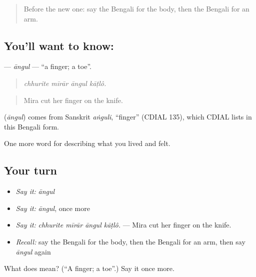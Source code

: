 \label{lesson:BN-C466-angul}



\begin{quote}
Before the new one: say the Bengali for the body, then the Bengali for an arm.
\end{quote}

\subsection*{You'll want to know: }
\textbf{} — \emph{āngul} — \textquotedblleft{}a finger; a toe\textquotedblright{}.

\begin{quote}
   
\end{quote}

\begin{quote}
\emph{chhurite mīrār āngul kāṭlô.}
\end{quote}

\begin{quote}
Mira cut her finger on the knife.
\end{quote}

\begin{cousinweb}
\textbf{} (\emph{āngul}) comes from Sanskrit \emph{aṅguli}, \textquotedblleft{}finger\textquotedblright{} (CDIAL 135), which CDIAL lists in this Bengali form.
\end{cousinweb}

\begin{grammarlens}[title={What you've built}]
One more word for describing what you lived and felt.
\end{grammarlens}

\subsection*{Your turn}
\begin{itemize}
\raggedright
  \item \emph{Say it:} \emph{āngul}
  \item \emph{Say it:} \emph{āngul}, once more
  \item \emph{Say it:} \emph{chhurite mīrār āngul kāṭlô.} — Mira cut her finger on the knife.
  \item \emph{Recall:} say the Bengali for the body, then the Bengali for an arm, then say \emph{āngul} again
\end{itemize}

\begin{tcolorbox}[breakable,colback=teal!4,colframe=teal!35!black,title={Before you move on}]
What does  mean? (\textquotedblleft{}A finger; a toe\textquotedblright{}.) Say it once more.
\end{tcolorbox}
